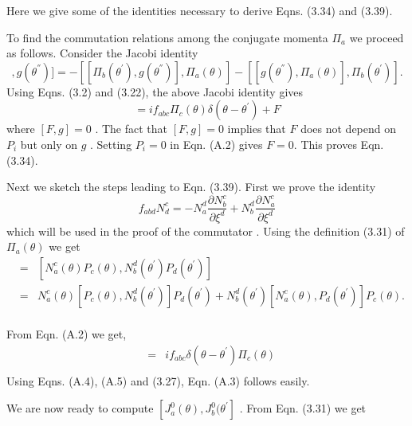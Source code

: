 \documentclass[a4paper,12pt]{article}
\let\oldtheequation=\theequation
\def\doteqs#1{\setcounter{equation}{0}
            \def\theequation{{#1}.\oldtheequation}}
\newcounter{axn}
\def\ax#1{\addtocounter{axn}{1} \bigskip\medskip \goodbreak
\noindent{\large\bf
{\Alph{axn}.~~#1}} \nobreak \medskip}
\def\axn#1{\ax{#1} \doteqs{\Alph{axn}}}
\begin{document}
\vskip 5mm
\axn{Appendix}
\vskip 5mm
Here we give some of the identities necessary to derive Eqns. (3.34)
and (3.39).

To find the commutation relations among the conjugate momenta 
$ {\Pi}_a $ we proceed as follows. Consider the Jacobi identity
\begin{equation}
[[\Pi_a (\theta), \Pi_b ({\theta}^{'})], g ({\theta}^{''})]
= - [[\Pi_b ({\theta}^{'}), g ({\theta}^{''})], \Pi_a (\theta)]
  - [[g ({\theta}^{''}), \Pi_a (\theta)], \Pi_b ({\theta}^{'})].
\end{equation}
Using Eqns. (3.2) and (3.22), the above Jacobi identity gives \cite{bal}
\begin{equation}
[{\Pi}_a({\theta}),{\Pi}_b({\theta}^{'})]
=i f_{abc}{\Pi}_c({\theta}) {\delta}(\theta -{\theta}^{'})+F
\end{equation}
where $[F,g]=0$ . The fact that  $[F,g]=0$ implies that $F$ does 
not depend on $P_i$ but only on $g$ . 
Setting  $P_i=0$ in Eqn. (A.2) gives $F=0$. This proves Eqn. (3.34).

Next we sketch the steps leading to Eqn. (3.39).
First we prove the identity
\begin{equation}
f_{abd}N_d^{c}=-N_a^{d}{\frac{{\partial}N_b^{{c}}}{{\partial}{\xi}^{d}}}+
N_b^{d}{\frac{{\partial}N_a^{{c}}}{{\partial}{\xi}^{d}}}
\end{equation}
which will be used in the proof of the commutator . 
Using the definition (3.31) of ${\Pi}_a(\theta)$ we get
\begin{eqnarray}
[{\Pi}_a(\theta),{\Pi}_b({\theta}^{'})]
&=&[N_a^{c}(\theta)P_c(\theta), 
N_b^{d}({\theta}^{'})P_d({\theta}^{'})]\nonumber\\
&=&N_a^{c}(\theta)[P_c(\theta), N_b^{d}
({\theta}^{'})]P_d({\theta}^{'}) + 
N_b^{d}({\theta}^{'})[N_a^{c}({\theta}),
P_d({\theta}^{'})]P_c(\theta).\nonumber\\
\end{eqnarray}

From Eqn. (A.2) we get,
\begin{eqnarray}
[{\Pi}_a(\theta),{\Pi}_b({\theta}^{'})]
&=&if_{abc}{\delta}(\theta-{\theta}^{'}){\Pi}_c(\theta)\nonumber\\
\end{eqnarray}
Using Eqns. (A.4), (A.5) and (3.27), Eqn. (A.3) follows easily. 

 
We are now ready to compute $[J^{0}_a(\theta),J^{0}_b({\theta}^{'}]$ . From
Eqn. (3.31) we get
\end{document}
